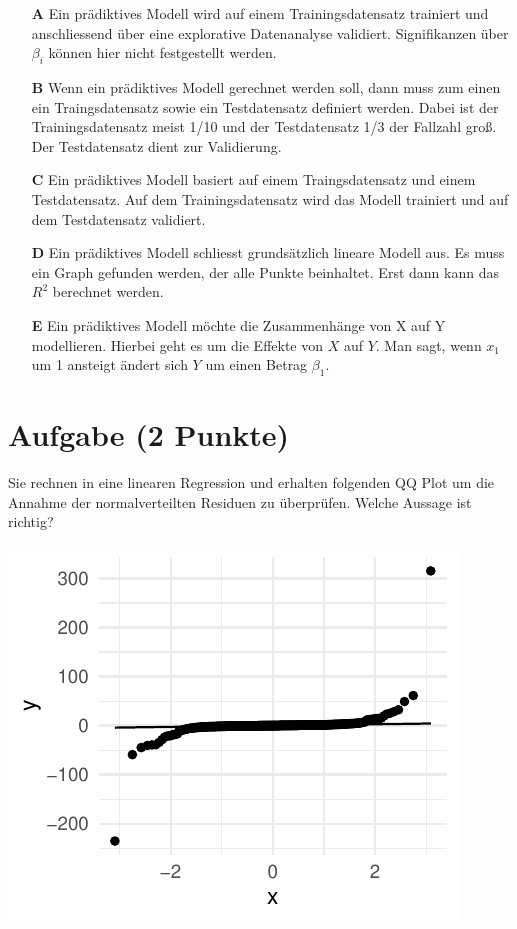 \documentclass[a4paper, 9pt]{scrartcl}\usepackage[]{graphicx}\usepackage[]{xcolor}
\makeatletter
\def\maxwidth{ %
  \ifdim\Gin@nat@width>\linewidth
    \linewidth
  \else
    \Gin@nat@width
  \fi
}
\makeatother
\begin{document}
\begin{enumerate}
\item [\textbf{A} \msquare] Ein prädiktives Modell wird auf einem Trainingsdatensatz trainiert und anschliessend über eine explorative Datenanalyse validiert. Signifikanzen über $\beta_i$ können hier nicht festgestellt werden.
\item [\textbf{B} \msquare] Wenn ein prädiktives Modell gerechnet werden soll, dann muss zum einen ein Traingsdatensatz sowie ein Testdatensatz definiert werden. Dabei ist der Trainingsdatensatz meist 1/10 und der Testdatensatz 1/3 der Fallzahl groß. Der Testdatensatz dient zur Validierung.
\item [\textbf{C} \msquare] Ein prädiktives Modell basiert auf einem Traingsdatensatz und einem Testdatensatz. Auf dem Trainingsdatensatz wird das Modell trainiert und auf dem Testdatensatz validiert.
\item [\textbf{D} \msquare] Ein prädiktives Modell schliesst grundsätzlich lineare Modell aus. Es muss ein Graph gefunden werden, der alle Punkte beinhaltet. Erst dann kann das $R^2$ berechnet werden.
\item [\textbf{E} \msquare] Ein prädiktives Modell möchte die Zusammenhänge von X auf Y modellieren. Hierbei geht es um die Effekte von $X$ auf $Y$. Man sagt, wenn $x_1$ um 1 ansteigt ändert sich $Y$ um einen Betrag $\beta_1$.
\end{enumerate}

\section{Aufgabe \hfill (2 Punkte)}



Sie rechnen in eine linearen Regression und erhalten folgenden QQ Plot um die Annahme der normalverteilten Residuen zu überprüfen. Welche Aussage ist richtig?



{\centering \includegraphics[width=\maxwidth]{img/mc-regression-05-a-1} 

}
\end{document}
